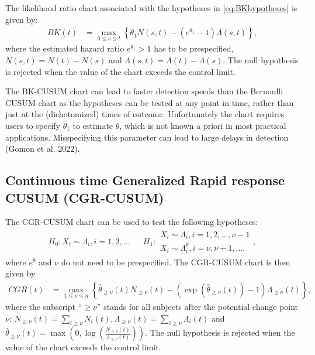 The likelihood ratio chart associated with the hypotheses in \eqref{eq:BKhypotheses} is given by:
\begin{align}
BK(t) &= \max_{0 \leq s \leq t} \left\lbrace \theta_1 N(s,t) - \left(  e^{\theta_1} - 1 \right)  \Lambda(s,t) \right\rbrace,
\label{eq:BKstatistic}
\end{align}
where the estimated hazard ratio \(e^{\theta_1} > 1\) has to be prespecified, \(N(s,t) = N(t) - N(s)\) and \(\Lambda(s,t) = \Lambda(t) - \Lambda(s)\). The null hypothesis is rejected when the value of the chart exceeds the control limit.

The BK-CUSUM chart can lead to faster detection speeds than the Bernoulli CUSUM chart as the hypotheses can be tested at any point in time, rather than just at the (dichotomized) times of outcome. Unfortunately the chart requires users to specify \(\theta_1\) to estimate \(\theta\), which is not known a priori in most practical applications. Misspecifying this parameter can lead to large delays in detection (Gomon et al. 2022).

\hypertarget{sec:CGRCUSUM}{%
\subsection{Continuous time Generalized Rapid response CUSUM (CGR-CUSUM)}\label{sec:CGRCUSUM}}

The CGR-CUSUM chart can be used to test the following hypotheses:
\begin{equation}
\begin{aligned}
H_0: X_i \sim \Lambda_i, i = 1,2,...  & &H_1: 
\begin{array}{l}
X_i \sim \Lambda_i, i = 1, 2, ..., \nu -1 \\
X_i \sim \Lambda_i^\theta, i = \nu, \nu +1, ... .
\end{array},
\end{aligned}
\label{eq:CGRhypotheses}
\end{equation}
where \(e^\theta\) and \(\nu\) do not need to be prespecified. The CGR-CUSUM chart is then given by
\begin{align}
        CGR(t) &= \max_{1 \leq \nu \leq n} \left\lbrace \hat{\theta}_{\geq \nu}(t) N_{\geq \nu}(t) - \left( \exp\left(\hat{\theta}_{\geq \nu}(t)\right) - 1 \right)  \Lambda_{\geq \nu}(t) \right\rbrace,
        \label{eq:CGRStatistic}
\end{align} where the subscript ``\(\geq \nu\)'' stands for all subjects after the potential change point \(\nu\): \(N_{\geq \nu}(t) = \sum_{i \geq \nu} N_i(t), \Lambda_{\geq \nu}(t) = \sum_{i \geq \nu} \Lambda_i(t)\)
and \(\hat{\theta}_{\geq \nu}(t) = \max \left(0, \log \left( \frac{N_{\geq \nu}(t)}{ \Lambda_{\geq \nu}(t) } \right) \right)\). The null hypothesis is rejected when the value of the chart exceeds the control limit.

